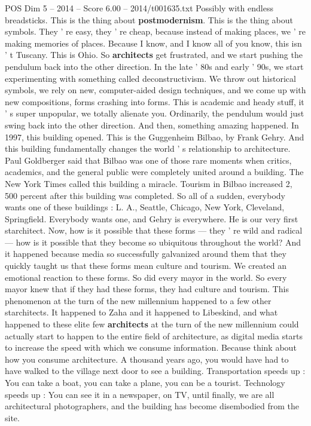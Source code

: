 \begin{textsample}{POS Dim 5 – 2014 – Score 6.00 – 2014/t001635.txt}
Possibly with endless breadsticks.
This is the thing about \textbf{postmodernism}.
This is the thing about symbols.
They ' re easy, they ' re cheap, because instead of making places, we ' re making memories of places.
Because I know, and I know all of you know, this isn ' t Tuscany.
This is Ohio.
So \textbf{architects} get frustrated, and we start pushing the pendulum back into the other direction.
In the late ' 80s and early ' 90s, we start experimenting with something called deconstructivism.
We throw out historical symbols, we rely on new, computer-aided design techniques, and we come up with new compositions, forms crashing into forms.
This is academic and heady stuff, it ' s super unpopular, we totally alienate you.
Ordinarily, the pendulum would just swing back into the other direction.
And then, something amazing happened.
In 1997, this building opened.
This is the Guggenheim Bilbao, by Frank Gehry.
And this building fundamentally changes the world ' s relationship to architecture.
Paul Goldberger said that Bilbao was one of those rare moments when critics, academics, and the general public were completely united around a building.
The New York Times called this building a miracle.
Tourism in Bilbao increased 2, 500 percent after this building was completed.
So all of a sudden, everybody wants one of these buildings : L.
A., Seattle, Chicago, New York, Cleveland, Springfield.
Everybody wants one, and Gehry is everywhere.
He is our very first starchitect.
Now, how is it possible that these forms — they ' re wild and radical — how is it possible that they become so ubiquitous throughout the world?
And it happened because media so successfully galvanized around them that they quickly taught us that these forms mean culture and tourism.
We created an emotional reaction to these forms.
So did every mayor in the world.
So every mayor knew that if they had these forms, they had culture and tourism.
This phenomenon at the turn of the new millennium happened to a few other starchitects.
It happened to Zaha and it happened to Libeskind, and what happened to these elite few \textbf{architects} at the turn of the new millennium could actually start to happen to the entire field of architecture, as digital media starts to increase the speed with which we consume information.
Because think about how you consume architecture.
A thousand years ago, you would have had to have walked to the village next door to see a building.
Transportation speeds up : You can take a boat, you can take a plane, you can be a tourist.
Technology speeds up : You can see it in a newspaper, on TV, until finally, we are all architectural photographers, and the building has become disembodied from the site.

\end{textsample}
